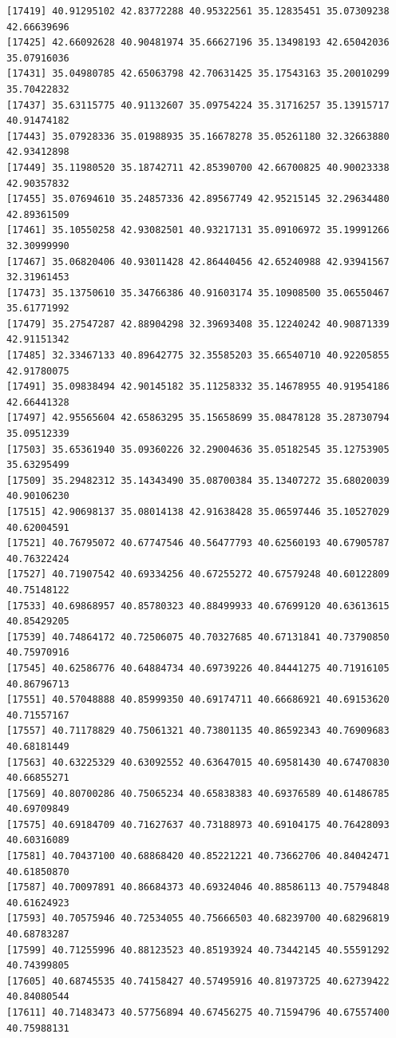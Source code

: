 \documentclass[
  letterpaper,
  DIV=11,
  numbers=noendperiod]{scrartcl}
\begin{document}
\begin{verbatim}
[17419] 40.91295102 42.83772288 40.95322561 35.12835451 35.07309238 42.66639696
[17425] 42.66092628 40.90481974 35.66627196 35.13498193 42.65042036 35.07916036
[17431] 35.04980785 42.65063798 42.70631425 35.17543163 35.20010299 35.70422832
[17437] 35.63115775 40.91132607 35.09754224 35.31716257 35.13915717 40.91474182
[17443] 35.07928336 35.01988935 35.16678278 35.05261180 32.32663880 42.93412898
[17449] 35.11980520 35.18742711 42.85390700 42.66700825 40.90023338 42.90357832
[17455] 35.07694610 35.24857336 42.89567749 42.95215145 32.29634480 42.89361509
[17461] 35.10550258 42.93082501 40.93217131 35.09106972 35.19991266 32.30999990
[17467] 35.06820406 40.93011428 42.86440456 42.65240988 42.93941567 32.31961453
[17473] 35.13750610 35.34766386 40.91603174 35.10908500 35.06550467 35.61771992
[17479] 35.27547287 42.88904298 32.39693408 35.12240242 40.90871339 42.91151342
[17485] 32.33467133 40.89642775 32.35585203 35.66540710 40.92205855 42.91780075
[17491] 35.09838494 42.90145182 35.11258332 35.14678955 40.91954186 42.66441328
[17497] 42.95565604 42.65863295 35.15658699 35.08478128 35.28730794 35.09512339
[17503] 35.65361940 35.09360226 32.29004636 35.05182545 35.12753905 35.63295499
[17509] 35.29482312 35.14343490 35.08700384 35.13407272 35.68020039 40.90106230
[17515] 42.90698137 35.08014138 42.91638428 35.06597446 35.10527029 40.62004591
[17521] 40.76795072 40.67747546 40.56477793 40.62560193 40.67905787 40.76322424
[17527] 40.71907542 40.69334256 40.67255272 40.67579248 40.60122809 40.75148122
[17533] 40.69868957 40.85780323 40.88499933 40.67699120 40.63613615 40.85429205
[17539] 40.74864172 40.72506075 40.70327685 40.67131841 40.73790850 40.75970916
[17545] 40.62586776 40.64884734 40.69739226 40.84441275 40.71916105 40.86796713
[17551] 40.57048888 40.85999350 40.69174711 40.66686921 40.69153620 40.71557167
[17557] 40.71178829 40.75061321 40.73801135 40.86592343 40.76909683 40.68181449
[17563] 40.63225329 40.63092552 40.63647015 40.69581430 40.67470830 40.66855271
[17569] 40.80700286 40.75065234 40.65838383 40.69376589 40.61486785 40.69709849
[17575] 40.69184709 40.71627637 40.73188973 40.69104175 40.76428093 40.60316089
[17581] 40.70437100 40.68868420 40.85221221 40.73662706 40.84042471 40.61850870
[17587] 40.70097891 40.86684373 40.69324046 40.88586113 40.75794848 40.61624923
[17593] 40.70575946 40.72534055 40.75666503 40.68239700 40.68296819 40.68783287
[17599] 40.71255996 40.88123523 40.85193924 40.73442145 40.55591292 40.74399805
[17605] 40.68745535 40.74158427 40.57495916 40.81973725 40.62739422 40.84080544
[17611] 40.71483473 40.57756894 40.67456275 40.71594796 40.67557400 40.75988131

\end{verbatim}
\end{document}
